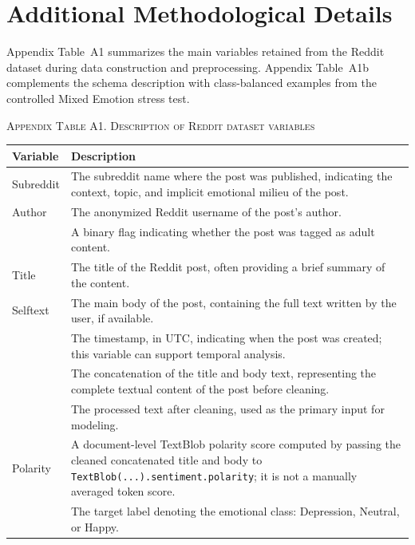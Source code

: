 \documentclass{ieeeaccess}
\begin{document}
\section{Additional Methodological Details}

Appendix Table~A1 summarizes the main variables retained from the Reddit dataset during data construction and preprocessing. Appendix Table~A1b complements the schema description with class-balanced examples from the controlled Mixed Emotion stress test.

\par\medskip
\noindent\textsc{Appendix Table A1. Description of Reddit dataset variables}\par
\label{tab:appendix-a1-reddit-variables}
\smallskip
\small
\setlength{\tabcolsep}{4pt}
\renewcommand{\arraystretch}{1.18}
\noindent\begin{tabularx}{\textwidth}{@{}>{\raggedright\arraybackslash}p{}Y@{}}
\toprule
Variable & Description \\
\midrule
Subreddit & The subreddit name where the post was published, indicating the context, topic, and implicit emotional milieu of the post. \\
Author & The anonymized Reddit username of the post's author. \\
 & A binary flag indicating whether the post was tagged as adult content. \\
Title & The title of the Reddit post, often providing a brief summary of the content. \\
Selftext & The main body of the post, containing the full text written by the user, if available. \\
 & The timestamp, in UTC, indicating when the post was created; this variable can support temporal analysis. \\
 & The concatenation of the title and body text, representing the complete textual content of the post before cleaning. \\
 & The processed text after cleaning, used as the primary input for modeling. \\
Polarity & A document-level TextBlob polarity score computed by passing the cleaned concatenated title and body to \texttt{TextBlob(...).sentiment.polarity}; it is not a manually averaged token score. \\
 & The target label denoting the emotional class: Depression, Neutral, or Happy. \\
\bottomrule
\end{tabularx}
\par\medskip
\end{document}
